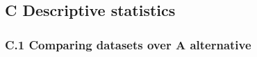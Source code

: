 \documentclass[11pt,]{article}
\begin{document}
\FloatBarrier

\newpage

\FloatBarrier

\hypertarget{c-descriptive-statistics}{%
\subsection*{C Descriptive statistics}\label{c-descriptive-statistics}}

\hypertarget{c.1-comparing-datasets-over-a-alternative}{%
\subsubsection*{C.1 Comparing datasets over A
alternative}\label{c.1-comparing-datasets-over-a-alternative}}

\FloatBarrier

\FloatBarrier
\end{document}
